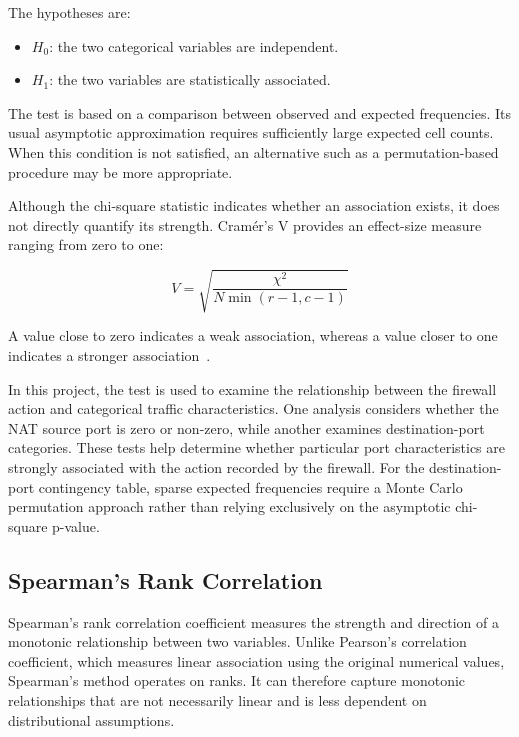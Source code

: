 The hypotheses are:

\begin{itemize}
  \item $H_0$: the two categorical variables are independent.
  \item $H_1$: the two variables are statistically associated.
\end{itemize}

The test is based on a comparison between observed and expected frequencies. Its usual asymptotic approximation requires sufficiently large expected cell counts. When this condition is not satisfied, an alternative such as a permutation-based procedure may be more appropriate.

Although the chi-square statistic indicates whether an association exists, it does not directly quantify its strength. Cramér's V provides an effect-size measure ranging from zero to one:

\begin{equation}
V =
\sqrt{
\frac{\chi^2}
{N\min(r-1,c-1)}
}
\label{eq:cramers_v}
\end{equation}

A value close to zero indicates a weak association, whereas a value closer to one indicates a stronger association~\cite{cramer1946mathematical}.

In this project, the test is used to examine the relationship between the firewall action and categorical traffic characteristics. One analysis considers whether the NAT source port is zero or non-zero, while another examines destination-port categories. These tests help determine whether particular port characteristics are strongly associated with the action recorded by the firewall. For the destination-port contingency table, sparse expected frequencies require a Monte Carlo permutation approach rather than relying exclusively on the asymptotic chi-square p-value.

\subsection{Spearman's Rank Correlation}

Spearman's rank correlation coefficient measures the strength and direction of a monotonic relationship between two variables. Unlike Pearson's correlation coefficient, which measures linear association using the original numerical values, Spearman's method operates on ranks. It can therefore capture monotonic relationships that are not necessarily linear and is less dependent on distributional assumptions.

